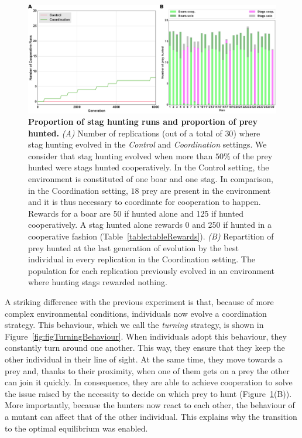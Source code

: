     \begin{figure}[h]
      \centerfloat
        \includegraphics[width=1.2\linewidth]{fig/ArticleBio2/Fig2.png}
        \caption{\textbf{Proportion of stag hunting runs and proportion of prey hunted.}
        \emph{(A)} Number of replications (out of a total of $30$) where stag hunting evolved in the \emph{Control} and \emph{Coordination} settings. We consider that stag hunting evolved when more than $50\%$ of the prey hunted were stags hunted cooperatively. In the Control setting, the environment is constituted of one boar and one stag. In comparison, in the Coordination setting, $18$ prey are present in the environment and it is thus necessary to coordinate for cooperation to happen. Rewards for a boar are 50 if hunted alone and 125 if hunted cooperatively. A stag hunted alone rewards 0 and 250 if hunted in a cooperative fashion (Table~\ref{table:tableRewards}). \emph{(B)} Repartition of prey hunted at the last generation of evolution by the best individual in every replication in the Coordination setting. The population for each replication previously evolved in an environment where hunting stags rewarded nothing.}
      \label{fig:figRecycling}
    \end{figure}

    A striking difference with the previous experiment is that, because of more complex environmental conditions, individuals now evolve a coordination strategy. This behaviour, which we call the \emph{turning} strategy, is shown in Figure~\ref{fig:figTurningBehaviour}. When individuals adopt this behaviour, they constantly turn around one another. This way, they ensure that they keep the other individual in their line of sight. At the same time, they move towards a prey and, thanks to their proximity, when one of them gets on a prey the other can join it quickly. In consequence, they are able to achieve cooperation to solve the issue raised by the necessity to decide on which prey to hunt (Figure~\ref{fig:figRecycling}(B)). More importantly, because the hunters now react to each other, the behaviour of a mutant can affect that of the other individual. This explains why the transition to the optimal equilibrium was enabled.

